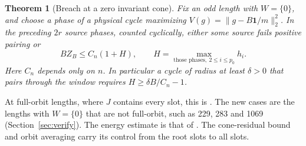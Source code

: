 \documentclass[11pt]{amsart}
\newtheorem{theorem}{Theorem}
\theoremstyle{definition}
\newcommand{\one}{\mathbf 1}
\begin{document}
\begin{theorem}[Breach at a zero invariant cone]\label{th:breach}
Fix an odd length with \(W=\{0\}\), and choose a phase of a physical
cycle maximizing \(V(g)=\|g-B\one/m\|_2^2\). In the preceding
\(2r\) source phases, counted cyclically, either some source fails
positive pairing or
\[
 BZ_B\le C_n(1+H),
 \qquad H=\max_{\text{those phases},\ 2\le i\le p_0} h_i .
\]
Here \(C_n\) depends only on \(n\).
In particular a cycle of radius at least \(\delta>0\) that pairs
through the window requires \(H\ge\delta B/C_n-1\).
\end{theorem}

At full-orbit lengths, where \(J\) contains every slot, this is
\cite[Theorem~2]{G10}. The new cases are the lengths with \(W=\{0\}\)
that are not full-orbit, such as 229, 283 and 1069
(Section~\ref{sec:verify}). The energy estimate is that of \cite{G10}.
The cone-residual bound and orbit averaging carry its control from the
root slots to all slots.
\end{document}
